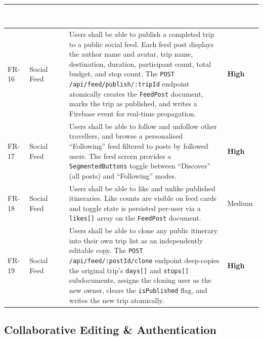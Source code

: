 \documentclass[12pt, a4paper]{article}
\newcommand{\reqid}[1]{\textsc{\small #1}}
\newcommand{\high}{\textbf{High}}
\newcommand{\medium}{Medium}
\newcommand{\thcell}[1]{\textcolor{white}{\textbf{\small #1}}}
\begin{document}
\vspace{0.4em}
\begin{longtable}{C{1.6cm} C{2.0cm} L{8.2cm} C{1.8cm}}
\toprule
{}
\thcell{Req ID} & \thcell{Category} & \thcell{Requirement} & \thcell{Priority} \\
\midrule
\endhead
\bottomrule
\endfoot

\reqid{FR-16} & Social Feed &
Users shall be able to publish a completed trip to a public social feed. Each feed post displays the author name and avatar, trip name, destination, duration, participant count, total budget, and stop count. The \texttt{POST /api/feed/publish/:tripId} endpoint atomically creates the \texttt{FeedPost} document, marks the trip as published, and writes a Firebase event for real-time propagation. &
\high \\

\reqid{FR-17} & Social Feed &
Users shall be able to follow and unfollow other travellers, and browse a personalised ``Following'' feed filtered to posts by followed users. The feed screen provides a \texttt{SegmentedButtons} toggle between ``Discover'' (all posts) and ``Following'' modes. &
\high \\

\reqid{FR-18} & Social Feed &
Users shall be able to like and unlike published itineraries. Like counts are visible on feed cards and toggle state is persisted per-user via a \texttt{likes[]} array on the \texttt{FeedPost} document. &
\medium \\

\reqid{FR-19} & Social Feed &
Users shall be able to clone any public itinerary into their own trip list as an independently editable copy. The \texttt{POST /api/feed/:postId/clone} endpoint deep-copies the original trip's \texttt{days[]} and \texttt{stops[]} subdocuments, assigns the cloning user as the new owner, clears the \texttt{isPublished} flag, and writes the new trip atomically. &
\high \\

\end{longtable}

\subsection{Collaborative Editing \& Authentication}
\end{document}
